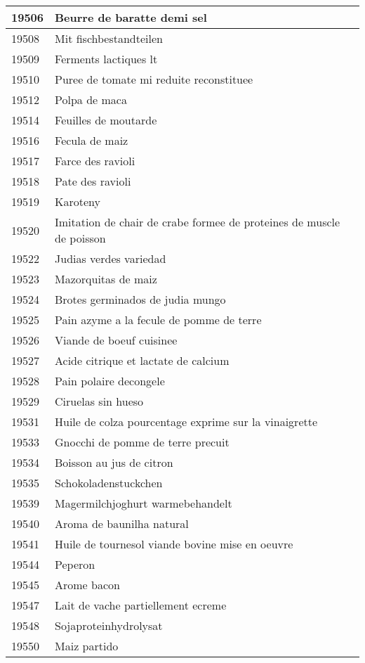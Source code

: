\begin{longtable}{|l|l|}
19506 & Beurre de baratte demi sel \\ \hline 
19508 & Mit fischbestandteilen \\ \hline 
19509 & Ferments lactiques lt \\ \hline 
19510 & Puree de tomate mi reduite reconstituee \\ \hline 
19512 & Polpa de maca \\ \hline 
19514 & Feuilles de moutarde \\ \hline 
19516 & Fecula de maiz \\ \hline 
19517 & Farce des ravioli \\ \hline 
19518 & Pate des ravioli \\ \hline 
19519 & Karoteny \\ \hline 
19520 & Imitation de chair de crabe formee de proteines de muscle de poisson \\ \hline 
19522 & Judias verdes variedad \\ \hline 
19523 & Mazorquitas de maiz \\ \hline 
19524 & Brotes germinados de judia mungo \\ \hline 
19525 & Pain azyme a la fecule de pomme de terre \\ \hline 
19526 & Viande de boeuf cuisinee \\ \hline 
19527 & Acide citrique et lactate de calcium \\ \hline 
19528 & Pain polaire decongele \\ \hline 
19529 & Ciruelas sin hueso \\ \hline 
19531 & Huile de colza pourcentage exprime sur la vinaigrette \\ \hline 
19533 & Gnocchi de pomme de terre precuit \\ \hline 
19534 & Boisson au jus de citron \\ \hline 
19535 & Schokoladenstuckchen \\ \hline 
19539 & Magermilchjoghurt warmebehandelt \\ \hline 
19540 & Aroma de baunilha natural \\ \hline 
19541 & Huile de tournesol viande bovine mise en oeuvre \\ \hline 
19544 & Peperon \\ \hline 
19545 & Arome bacon \\ \hline 
19547 & Lait de vache partiellement ecreme \\ \hline 
19548 & Sojaproteinhydrolysat \\ \hline 
19550 & Maiz partido \\ \hline 

\end{longtable}
